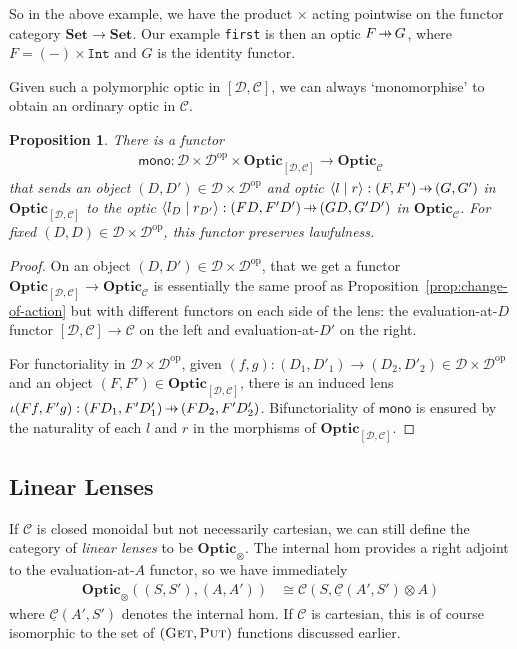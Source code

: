 \documentclass[11pt,letterpaper]{article}
\theoremstyle{plain}
\newtheorem{proposition}[theorem]{Proposition}
\theoremstyle{definition}
\newcommand{\C}{\mathscr{C}}
\newcommand{\homC}{\underline{\C}}
\newcommand{\D}{\mathscr{D}}
\newcommand{\Set}{\mathbf{Set}}
\newcommand{\Optic}{\mathbf{Optic}}
\newcommand{\op}{\mathrm{op}}
\newcommand{\rep}[2]{{\ensuremath \left\langle #1 \mid #2 \right\rangle}}
\newcommand{\fget}{\textsc{Get}}
\newcommand{\fput}{\textsc{Put}}
\newcommand{\hto}{\ensuremath{\,\mathaccent\shortmid\rightarrow\,}}
\begin{document}
So in the above example, we have the product $\times$ acting pointwise on the functor category $\Set \to \Set$. Our example \texttt{first} is then an optic $F \hto G$, where $F = (-) \times \texttt{Int}$ and $G$ is the identity functor.

Given such a polymorphic optic in $[\D, \C]$, we can always `monomorphise' to obtain an ordinary optic in $\C$.
\begin{proposition}
  There is a functor
  \begin{align*}
    \mathsf{mono} : \D \times \D^\op \times \Optic_{[\D, \C]} \to \Optic_\C
  \end{align*}
  that sends an object $(D, D') \in \D \times \D^\op$ and optic $\rep{l}{r} : (F, F') \hto (G, G')$ in $\Optic_{[\D, \C]}$ to the optic $\rep{l_D}{r_{D'}} : (FD, F'D') \hto (GD, G'D')$ in $\Optic_\C$. For fixed $(D, D) \in \D \times \D^\op$, this functor preserves lawfulness.
\end{proposition}
\begin{proof}
  On an object $(D, D') \in \D \times \D^\op$, that we get a functor $\Optic_{[\D, \C]} \to \Optic_\C$ is essentially the same proof as Proposition~\ref{prop:change-of-action} but with different functors on each side of the lens: the evaluation-at-$D$ functor $[\D, \C] \to \C$ on the left and evaluation-at-$D'$ on the right.

  For functoriality in $\D \times \D^\op$, given $(f, g) : (D_1, D'_1) \to (D_2, D'_2) \in \D \times \D^\op$ and an object $(F, F') \in \Optic_{[\D, \C]}$, there is an induced lens $\iota(Ff, F'g) : (FD_1, F'D'_1) \hto (FD_2, F'D'_2)$. Bifunctoriality of $\mathsf{mono}$ is ensured by the naturality of each $l$ and $r$ in the morphisms of $\Optic_{[\D, \C]}$.
\end{proof}

\subsection{Linear Lenses}\label{sec:linear-lenses}
\newcommand{\ev}{\mathsf{ev}}
\newcommand{\coev}{\mathsf{coev}}

If $\C$ is closed monoidal but not necessarily cartesian, we can still define the category of \emph{linear lenses} to be $\Optic_\otimes$. The internal hom provides a right adjoint to the evaluation-at-$A$ functor, so we have immediately
\begin{align*}
  \Optic_\otimes((S, S'), (A, A')) &\cong \C(S, \homC(A',S') \otimes A)
\end{align*}
where $\homC(A', S')$ denotes the internal hom. If $\C$ is cartesian, this is of course isomorphic to the set of $(\fget, \fput)$ functions discussed earlier.
\end{document}
